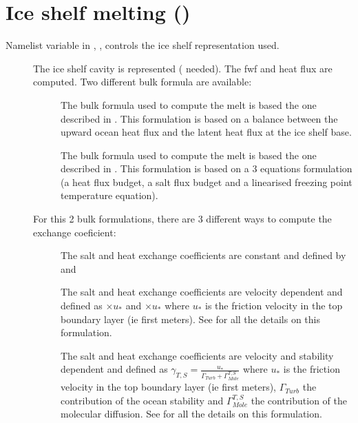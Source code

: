 \documentclass[../tex_main/NEMO_manual]{subfiles}
\begin{document}
\section{Ice shelf melting (\protect{})}
\label{sec:SBC_isf}
Namelist variable in , , controls the ice shelf representation used. 
\begin{description}
\item[]
The ice shelf cavity is represented ( needed). The fwf and heat flux are computed. 
Two different bulk formula are available:
	\begin{description}
	\item[]
	The bulk formula used to compute the melt is based the one described in \citet{Hunter2006}.
        This formulation is based on a balance between the upward ocean heat flux and the latent heat flux at the ice shelf base.

	\item[] 
	The bulk formula used to compute the melt is based the one described in \citet{Jenkins1991}.
        This formulation is based on a 3 equations formulation (a heat flux budget, a salt flux budget
         and a linearised freezing point temperature equation).
	\end{description}

For this 2 bulk formulations, there are 3 different ways to compute the exchange coeficient:
	\begin{description}
        \item[]
	The salt and heat exchange coefficients are constant and defined by  and 

	\item[]
	The salt and heat exchange coefficients are velocity dependent and defined as $ \times u_{*}$ and $ \times u_{*}$
        where $u_{*}$ is the friction velocity in the top boundary layer (ie first  meters).
        See \citet{Jenkins2010} for all the details on this formulation.
	
	\item[]
	The salt and heat exchange coefficients are velocity and stability dependent and defined as 
        $\gamma_{T,S} = \frac{u_{*}}{\Gamma_{Turb} + \Gamma^{T,S}_{Mole}}$
        where $u_{*}$ is the friction velocity in the top boundary layer (ie first  meters), 
        $\Gamma_{Turb}$ the contribution of the ocean stability and 
        $\Gamma^{T,S}_{Mole}$ the contribution of the molecular diffusion.
        See \citet{Holland1999} for all the details on this formulation.
        \end{description}


\end{description}
\end{document}
